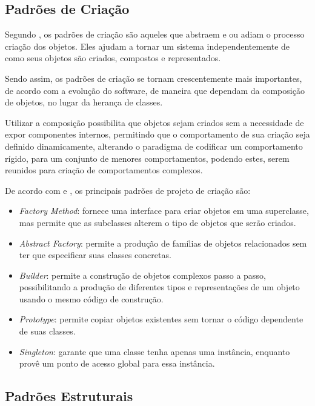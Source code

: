 \documentclass[12pt]{article}
\begin{document}
\subsection{Padrões de Criação}

Segundo \cite{devmedia_padroes}, os padrões de criação são aqueles 
que abstraem e ou adiam o processo criação dos objetos. Eles ajudam 
a tornar um sistema independentemente de como seus objetos são 
criados, compostos e representados.

Sendo assim, os padrões de criação se tornam crescentemente mais 
importantes, de acordo com a evolução do software, de maneira que 
dependam da composição de objetos, no lugar da herança de classes.  

Utilizar a composição possibilita que objetos sejam criados sem a 
necessidade de expor componentes internos, permitindo que o 
comportamento de sua criação seja definido dinamicamente, 
alterando o paradigma de codificar um comportamento rígido, para 
um conjunto de menores comportamentos, podendo estes, serem 
reunidos para criação de comportamentos complexos.

De acordo com \cite{gof} e \cite{guru}, os principais 
padrões de projeto de criação são:

\begin{itemize}
\item \textit{Factory Method}: fornece uma interface para criar 
objetos em uma superclasse, mas permite que as subclasses alterem 
o tipo de objetos que serão criados.
\item \textit{Abstract Factory}: permite a produção de famílias 
de objetos relacionados sem ter que especificar suas classes 
concretas.
\item \textit{Builder}: permite a construção de objetos complexos 
passo a passo, possibilitando a produção de diferentes tipos e 
representações de um objeto usando o mesmo código de construção.
\item \textit{Prototype}: permite copiar objetos existentes sem 
tornar o código dependente de suas classes.
\item \textit{Singleton}: garante que uma classe tenha apenas 
uma instância, enquanto provê um ponto de acesso global para 
essa instância.
\end{itemize}

\subsection{Padrões Estruturais}
\end{document}
